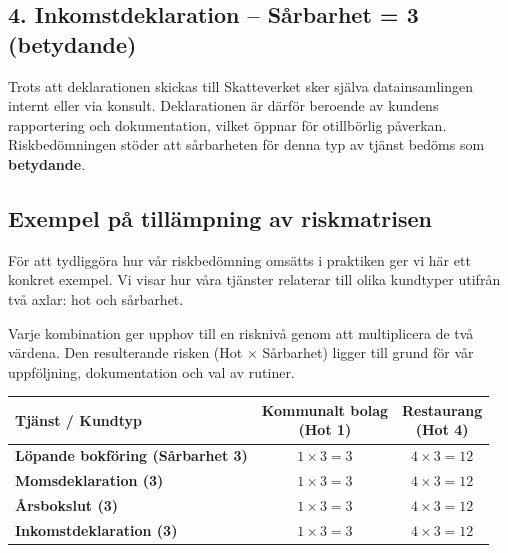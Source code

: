 \documentclass{article}
\begin{document}
\subsection*{4. Inkomstdeklaration – Sårbarhet = 3 (betydande)}
Trots att deklarationen skickas till Skatteverket sker själva datainsamlingen internt eller via konsult. Deklarationen är därför beroende av kundens rapportering och dokumentation, vilket öppnar för otillbörlig påverkan. Riskbedömningen stöder att sårbarheten för denna typ av tjänst bedöms som \textbf{betydande}.






\vspace{3em}
\subsection*{Exempel på tillämpning av riskmatrisen}

För att tydliggöra hur vår riskbedömning omsätts i praktiken ger vi här ett konkret exempel. Vi visar hur våra tjänster relaterar till olika kundtyper utifrån två axlar: hot och sårbarhet.

Varje kombination ger upphov till en risknivå genom att multiplicera de två värdena. Den resulterande risken (Hot $\times$ Sårbarhet) ligger till grund för vår uppföljning, dokumentation och val av rutiner.

\begin{center}
\renewcommand{\arraystretch}{1.5}
\begin{tabular}{|p{5cm}|c|c|}
\hline
\textbf{Tjänst / Kundtyp} 
& \shortstack{\textbf{Kommunalt bolag} \\ \textbf{(Hot 1)}} 
& \shortstack{\textbf{Restaurang} \\ \textbf{(Hot 4)}} \\
\hline
\textbf{Löpande bokföring (Sårbarhet 3)} & $1 \times 3 = 3$ & $4 \times 3 = 12$ \\
\hline
\textbf{Momsdeklaration (3)} & $1 \times 3 = 3$ & $4 \times 3 = 12$ \\
\hline
\textbf{Årsbokslut (3)} & $1 \times 3 = 3$ & $4 \times 3 = 12$ \\
\hline
\textbf{Inkomstdeklaration (3)} & $1 \times 3 = 3$ & $4 \times 3 = 12$ \\
\hline
\end{tabular}
\end{center}
\end{document}
